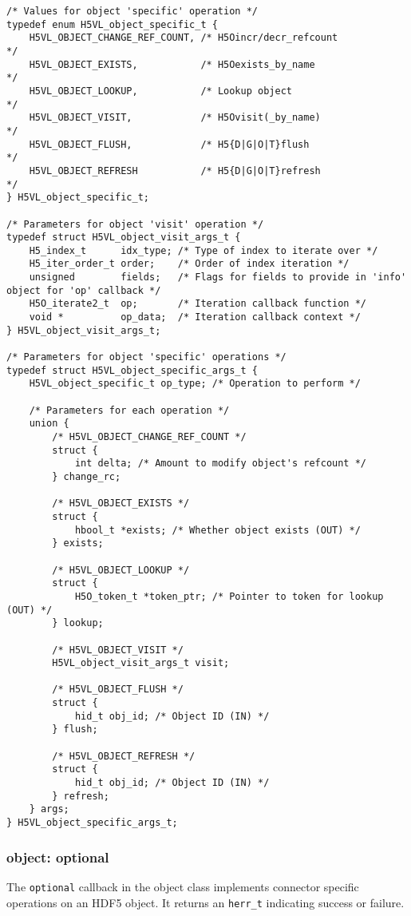 \begin{lstlisting}
/* Values for object 'specific' operation */
typedef enum H5VL_object_specific_t {
    H5VL_OBJECT_CHANGE_REF_COUNT, /* H5Oincr/decr_refcount             */
    H5VL_OBJECT_EXISTS,           /* H5Oexists_by_name                 */
    H5VL_OBJECT_LOOKUP,           /* Lookup object                     */
    H5VL_OBJECT_VISIT,            /* H5Ovisit(_by_name)                */
    H5VL_OBJECT_FLUSH,            /* H5{D|G|O|T}flush                  */
    H5VL_OBJECT_REFRESH           /* H5{D|G|O|T}refresh                */
} H5VL_object_specific_t;

/* Parameters for object 'visit' operation */
typedef struct H5VL_object_visit_args_t {
    H5_index_t      idx_type; /* Type of index to iterate over */
    H5_iter_order_t order;    /* Order of index iteration */
    unsigned        fields;   /* Flags for fields to provide in 'info' object for 'op' callback */
    H5O_iterate2_t  op;       /* Iteration callback function */
    void *          op_data;  /* Iteration callback context */
} H5VL_object_visit_args_t;

/* Parameters for object 'specific' operations */
typedef struct H5VL_object_specific_args_t {
    H5VL_object_specific_t op_type; /* Operation to perform */

    /* Parameters for each operation */
    union {
        /* H5VL_OBJECT_CHANGE_REF_COUNT */
        struct {
            int delta; /* Amount to modify object's refcount */
        } change_rc;

        /* H5VL_OBJECT_EXISTS */
        struct {
            hbool_t *exists; /* Whether object exists (OUT) */
        } exists;

        /* H5VL_OBJECT_LOOKUP */
        struct {
            H5O_token_t *token_ptr; /* Pointer to token for lookup (OUT) */
        } lookup;

        /* H5VL_OBJECT_VISIT */
        H5VL_object_visit_args_t visit;

        /* H5VL_OBJECT_FLUSH */
        struct {
            hid_t obj_id; /* Object ID (IN) */
        } flush;

        /* H5VL_OBJECT_REFRESH */
        struct {
            hid_t obj_id; /* Object ID (IN) */
        } refresh;
    } args;
} H5VL_object_specific_args_t;
\end{lstlisting}

\subsubsection{object: optional}
The \texttt{optional} callback in the object class implements connector specific operations on an HDF5 object. It returns an \texttt{herr\_t} indicating success or failure. \bigskip


